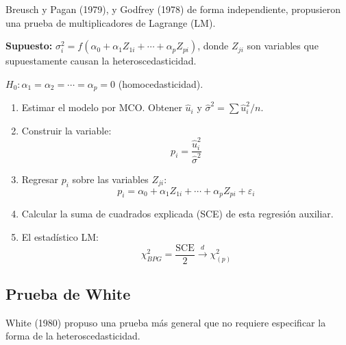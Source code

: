 \documentclass[12pt,a4paper]{report}
\theoremstyle{definition}
\theoremstyle{remark}
\newcommand{\uhat}{\hat{u}}
\newcommand{\sigmahat}{\hat{\sigma}}
\begin{document}
Breusch y Pagan (1979), y Godfrey (1978) de forma independiente, propusieron una prueba de multiplicadores de Lagrange (LM).

\textbf{Supuesto:} $\sigma_i^2 = f(\alpha_0 + \alpha_1 Z_{1i} + \cdots + \alpha_p Z_{pi})$, donde $Z_{ji}$ son variables que supuestamente causan la heteroscedasticidad.

$H_0: \alpha_1 = \alpha_2 = \cdots = \alpha_p = 0$ (homocedasticidad).

\begin{tcolorbox}[notastyle, title={Procedimiento: Breusch-Pagan-Godfrey}]
  \begin{enumerate}[label=\textbf{Paso \arabic*:}]
    \item Estimar el modelo por MCO. Obtener $\uhat_i$ y $\sigmahat^2 = \sum \uhat_i^2/n$.
    \item Construir la variable:
    \begin{equation}
      p_i = \frac{\uhat_i^2}{\sigmahat^2}
      \label{eq:bpg_pi}
    \end{equation}
    \item Regresar $p_i$ sobre las variables $Z_{ji}$:
    \begin{equation}
      p_i = \alpha_0 + \alpha_1 Z_{1i} + \cdots + \alpha_p Z_{pi} + \varepsilon_i
      \label{eq:bpg_regresion}
    \end{equation}
    \item Calcular la suma de cuadrados explicada (SCE) de esta regresión auxiliar.
    \item El estadístico LM:
    \begin{equation}
      \chi^2_{BPG} = \frac{\text{SCE}}{2} \xrightarrow{d} \chi^2_{(p)}
      \label{eq:bpg_stat}
    \end{equation}
  \end{enumerate}
\end{tcolorbox}

\subsection{Prueba de White}

White (1980) propuso una prueba más general que no requiere especificar la forma de la heteroscedasticidad.
\end{document}
